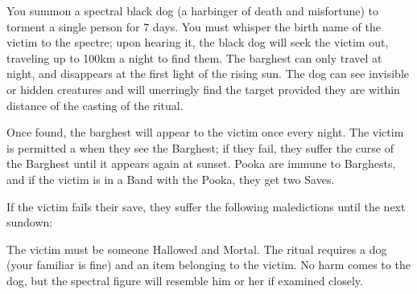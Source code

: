 
\newpage






\OCCULT[
  Name=Barghest,
  Link=occultism-barghest,
  Pips=5,
  Time=Days
]

You summon a spectral black dog (a harbinger of death and misfortune) to torment a single person for 7 days.  You must whisper the birth name of the victim to the spectre; upon hearing it, the black dog will seek the victim out, traveling up to 100km a night to find them.  The barghest can only travel at night, and disappears at the first light of the rising sun.  The dog can see invisible or hidden creatures and will unerringly find the target provided they are within distance of the casting of the ritual.

Once found, the barghest will appear to the victim once every night.  The victim is permitted a  when they see the Barghest; if they fail, they suffer the curse of the Barghest until it appears again at sunset.  Pooka are immune to Barghests, and if the victim is in a Band with the Pooka, they get two Saves.

If the victim fails their save, they suffer the following maledictions until the next sundown:


The victim must be someone Hallowed and Mortal.  The ritual requires a dog (your familiar is fine) and an item belonging to the victim. No harm comes to the dog, but the spectral figure will resemble him or her if examined closely.

\OCCULT[
  Name=Bind Familiar,
  Link=occultism-bind-familiar,
  Pips=2,
  Time=Weeks
]

